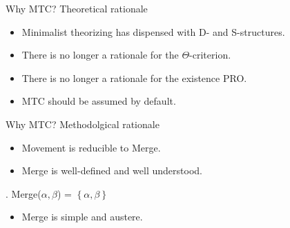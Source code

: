 \documentclass[Proposal]{subfiles}
\begin{document}
\begin{frame}
  {Why MTC?}
  {Theoretical rationale \parencite[see also][]{hornstein2001move}}

  \begin{itemize}
    \item Minimalist theorizing has dispensed with D- and S-structures.
      \pause
    \item There is no longer a rationale  for the $\Theta$-criterion.
      \pause
    \item There is no longer a rationale for the existence PRO.
      \pause
    \item MTC should be assumed by default.
  \end{itemize}
\end{frame}
\begin{frame}
  {Why MTC?}
  {Methodolgical rationale}

  \begin{itemize}
    \item Movement is reducible to Merge. \parencite{chomsky2004beyond}
    \item Merge is well-defined and well understood.
  \end{itemize}
  \ex. Merge($\alpha, \beta$) = $\left\{ \alpha, \beta \right\}$

  \begin{itemize}
    \item Merge is simple and austere.
  \end{itemize}
\end{frame}
\end{document}
